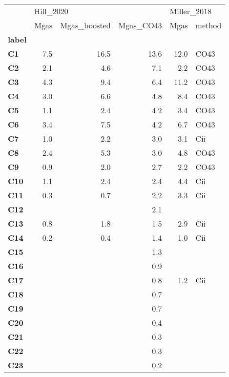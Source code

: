 \begin{tabular}{lrrrrl}
\toprule
{} & \multicolumn{3}{l}{Hill\_2020} & \multicolumn{2}{l}{Miller\_2018} \\
{} &      Mgas & Mgas\_boosted & Mgas\_CO43 &        Mgas & method \\
\textbf{label} &           &              &           &             &        \\
\midrule
\textbf{C1   } &       7.5 &         16.5 &      13.6 &        12.0 &   CO43 \\
\textbf{C2   } &       2.1 &          4.6 &       7.1 &         2.2 &   CO43 \\
\textbf{C3   } &       4.3 &          9.4 &       6.4 &        11.2 &   CO43 \\
\textbf{C4   } &       3.0 &          6.6 &       4.8 &         8.4 &   CO43 \\
\textbf{C5   } &       1.1 &          2.4 &       4.2 &         3.4 &   CO43 \\
\textbf{C6   } &       3.4 &          7.5 &       4.2 &         6.7 &   CO43 \\
\textbf{C7   } &       1.0 &          2.2 &       3.0 &         3.1 &    Cii \\
\textbf{C8   } &       2.4 &          5.3 &       3.0 &         4.8 &   CO43 \\
\textbf{C9   } &       0.9 &          2.0 &       2.7 &         2.2 &   CO43 \\
\textbf{C10  } &       1.1 &          2.4 &       2.4 &         4.4 &    Cii \\
\textbf{C11  } &       0.3 &          0.7 &       2.2 &         3.3 &    Cii \\
\textbf{C12  } &           &              &       2.1 &             &        \\
\textbf{C13  } &       0.8 &          1.8 &       1.5 &         2.9 &    Cii \\
\textbf{C14  } &       0.2 &          0.4 &       1.4 &         1.0 &    Cii \\
\textbf{C15  } &           &              &       1.3 &             &        \\
\textbf{C16  } &           &              &       0.9 &             &        \\
\textbf{C17  } &           &              &       0.8 &         1.2 &    Cii \\
\textbf{C18  } &           &              &       0.7 &             &        \\
\textbf{C19  } &           &              &       0.7 &             &        \\
\textbf{C20  } &           &              &       0.4 &             &        \\
\textbf{C21  } &           &              &       0.3 &             &        \\
\textbf{C22  } &           &              &       0.3 &             &        \\
\textbf{C23  } &           &              &       0.2 &             &        \\
\bottomrule
\end{tabular}
